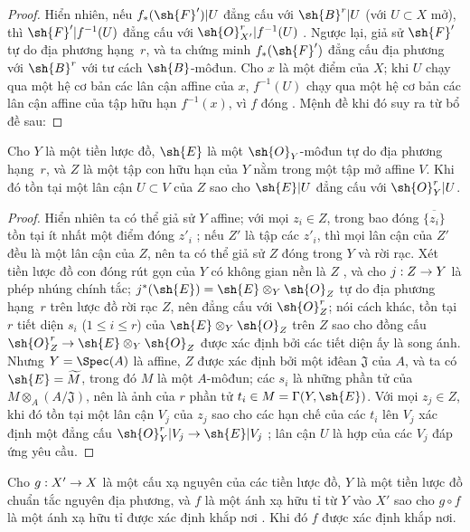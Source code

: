 \documentclass[oneside,10pt]{amsart}
\makeatletter
\renewcommand{\leq}{\leqslant}
\newcommand{\ega@arrow}[2]{\mathchoice{#1}{#2}{#2}{#2}}
\renewcommand{\to}{\ega@arrow{\longrightarrow}{\rightarrow}}
\newcommand{\oldpage}[2][]{\marginnote{\normalfont\footnotesize\textbf{#1}~|~#2}\ignorespaces}
\let\EGAOriginalLabel\label
\renewcommand{\label}[1]{\phantomsection\EGAOriginalLabel{#1}}
\makeatother
\begin{document}
\begin{proof}
Hiển nhiên, nếu $f_*(\sh{F}')|U$ đẳng cấu với $\sh{B}^r|U$ (với $U\subset X$ mở), thì $\sh{F}'|f^{-1}(U)$ đẳng cấu với $\sh{O}_{X'}^r|f^{-1}(U)$ .
Ngược lại, giả sử $\sh{F}'$ tự do địa phương hạng~$r$, và ta chứng minh $f_*(\sh{F}')$ đẳng cấu địa phương với $\sh{B}^r$ với tư cách $\sh{B}$-môđun.
Cho $x$ là một điểm của $X$;
khi $U$ chạy qua một hệ cơ bản các lân cận affine của $x$, $f^{-1}(U)$ chạy qua một hệ cơ bản các lân cận affine  của tập hữu hạn $f^{-1}(x)$, vì $f$ đóng .
Mệnh đề khi đó suy ra từ bổ đề sau:
\end{proof}

\begin{lemma}[6.1.12.1]
\label{II.6.1.12.1}
Cho $Y$ là một tiền lược đồ, $\sh{E}$ là một $\sh{O}_Y$-môđun tự do địa phương hạng~$r$, và $Z$ là một tập con hữu hạn của $Y$ nằm trong một tập mở affine $V$.
Khi đó tồn tại một lân cận $U\subset V$ của $Z$ sao cho $\sh{E}|U$ đẳng cấu với $\sh{O}_Y^r|U$.
\end{lemma}

\begin{proof}
Hiển nhiên ta có thể giả sử $Y$ affine;
với mọi $z_i\in Z$, trong bao đóng $\overline{\{z_i\}}$ tồn tại ít nhất một điểm đóng $z'_i$ ;
nếu $Z'$ là tập các $z'_i$, thì mọi lân cận của $Z'$ đều là một lân cận của $Z$, nên ta có thể giả sử $Z$ đóng trong $Y$ và rời rạc.
Xét tiền lược đồ con đóng rút gọn của $Y$ có không gian nền là $Z$ , và cho $j:Z\to Y$ là phép nhúng chính tắc;
$j^*(\sh{E})=\sh{E}\otimes_Y\sh{O}_Z$ tự do địa phương hạng~$r$ trên lược đồ rời rạc $Z$, nên đẳng cấu với $\sh{O}_Z^r$;
nói cách khác, tồn tại $r$ tiết diện $s_i$ ($1\leq i\leq r$) của $\sh{E}\otimes_Y\sh{O}_Z$ trên $Z$ sao cho đồng cấu $\sh{O}_Z^r\to\sh{E}\otimes_Y\sh{O}_Z$ được xác định bởi các tiết diện ấy là song ánh.
Nhưng $Y=\Spec(A)$ là affine, $Z$ được xác định bởi một iđêan $\mathfrak{J}$ của $A$, và ta có $\sh{E}=\widetilde{M}$, trong đó $M$ là một $A$-môđun;
các $s_i$ là những phần tử của $M\otimes_A(A/\mathfrak{J})$, nên là ảnh của $r$ phần tử $t_i\in M=\Gamma(Y,\sh{E})$.
\oldpage[II]{114}
Với mọi $z_j\in Z$, khi đó tồn tại một lân cận $V_j$ của $z_j$ sao cho các hạn chế của các $t_i$ lên $V_j$ xác định một đẳng cấu $\sh{O}_Y^r|V_j\to\sh{E}|V_j$ ;
lân cận $U$ là hợp của các $V_j$ đáp ứng yêu cầu.
\end{proof}

\begin{proposition}[6.1.13]
\label{II.6.1.13}
Cho $g:X'\to X$ là một cấu xạ nguyên của các tiền lược đồ, $Y$ là một tiền lược đồ chuẩn tắc nguyên địa phương, và $f$ là một ánh xạ hữu tỉ từ $Y$ vào $X'$ sao cho $g\circ f$ là một ánh xạ hữu tỉ được xác định khắp nơi .
Khi đó $f$ được xác định khắp nơi.
\end{proposition}
\end{document}
